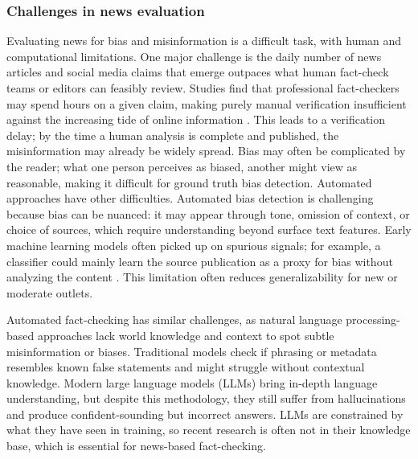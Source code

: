 \documentclass[11pt]{article}
\begin{document}
\subsubsection{Challenges in news evaluation }


Evaluating news for bias and misinformation is a difficult task, with human and computational limitations. One major challenge is the daily number of news articles and social media claims that emerge outpaces what human fact-check teams or editors can feasibly review. Studies find that professional fact-checkers may spend hours on a given claim, making purely manual verification insufficient against the increasing tide of online information \cite{r12}. This leads to a verification delay; by the time a human analysis is complete and published, the misinformation may already be widely spread. Bias may often be complicated by the reader; what one person perceives as biased, another might view as reasonable, making it difficult for ground truth bias detection.
Automated approaches have other difficulties. Automated bias detection is challenging because bias can be nuanced: it may appear through tone, omission of context, or choice of sources, which require understanding beyond surface text features. Early machine learning models often picked up on spurious signals; for example, a classifier could mainly learn the source publication as a proxy for bias without analyzing the content \cite{r13}. This limitation often reduces generalizability for new or moderate outlets.


Automated fact-checking has similar challenges, as natural language processing-based approaches lack world knowledge and context to spot subtle misinformation or biases. Traditional models check if phrasing or metadata resembles known false statements and might struggle without contextual knowledge. Modern large language models (LLMs) bring in-depth language understanding, but despite this methodology, they still suffer from hallucinations and produce confident-sounding but incorrect answers\cite{r14}. LLMs are constrained by what they have seen in training, so recent research is often not in their knowledge base, which is essential for news-based fact-checking.
 
\end{document}
